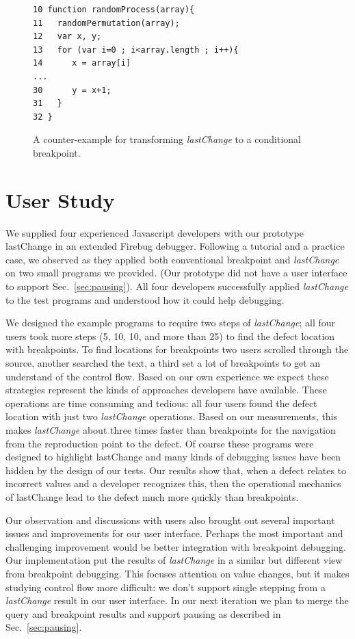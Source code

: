 \documentclass[runningheads,a4paper]{llncs}
\begin{document}
\begin{figure}[htp]
\begin{verbatim}
10 function randomProcess(array){
11   randomPermutation(array);
12   var x, y;
13   for (var i=0 ; i<array.length ; i++){
14      x = array[i]
...
30      y = x+1;
31   }
32 }
\end{verbatim}
\caption{A counter-example for transforming \textit{lastChange} to a conditional breakpoint.}
\label{fig:counter-example}
\end{figure}


\section{User Study}
We supplied four experienced Javascript developers with our prototype lastChange in an 
extended Firebug debugger. Following a tutorial and a practice case, we observed as they 
applied both conventional breakpoint and \textit{lastChange} on two small programs we 
provided. (Our prototype did not have a user interface to support Sec.~\ref{sec:pausing}).
All four developers successfully applied \textit{lastChange} to the test programs 
and understood how it could help debugging. 

We designed the example programs to require two steps of \textit{lastChange}; 
all four users took more steps (5, 10, 10, and more than 25) to find the defect location with breakpoints.  
To find locations for breakpoints two users scrolled through the source, 
another searched the text, a third set a lot of breakpoints to get an understand of the control flow. 
Based on our own experience we expect these strategies represent the kinds of approaches 
developers have available. These operations are time consuming and tedious: all four users 
found the defect location with just two \textit{lastChange} operations. Based on our measurements,
this makes \textit{lastChange} about three times faster than breakpoints for the navigation from 
the reproduction point to the defect.
Of course these programs were designed to highlight lastChange and many kinds of debugging 
issues have been hidden by the design of our tests. Our results show that, when a defect 
relates to incorrect values and a developer recognizes this, then the operational 
mechanics of lastChange lead to the defect much more quickly than breakpoints.

Our observation and discussions with users also brought out several important issues and improvements
for our user interface. Perhaps the most important and challenging improvement would be better integration 
with breakpoint debugging. Our implementation put the results of \textit{lastChange} in a similar but different
view from breakpoint debugging. This focuses attention on value changes, but it makes studying control 
flow more difficult: we don't support single stepping from a \textit{lastChange} result in our user interface. In our next iteration we 
plan to merge the query and breakpoint results and support pausing as described in Sec.~\ref{sec:pausing}.
\end{document}
